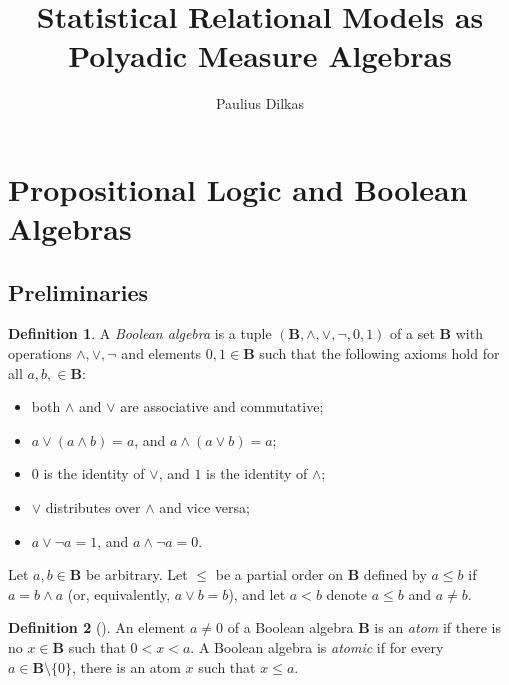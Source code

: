 \documentclass{article}
\title{Statistical Relational Models as Polyadic Measure Algebras}
\author{Paulius Dilkas}
\theoremstyle{definition}
\newtheorem{definition}{Definition}
\theoremstyle{remark}
\begin{document}
\maketitle



\section{Propositional Logic and Boolean Algebras}

\subsection{Preliminaries}

\begin{definition}
  A \emph{Boolean algebra} is a tuple $(\mathbf{B}, \land, \lor, \neg, 0, 1)$ of
  a set $\mathbf{B}$ with operations $\land, \lor, \neg$ and elements $0, 1 \in
  \mathbf{B}$ such that the following axioms hold for all $a, b, \in
  \mathbf{B}$:
  \begin{itemize}
  \item both $\land$ and $\lor$ are associative and commutative;
  \item $a \lor (a \land b) = a$, and $a \land (a \lor b) = a$;
  \item $0$ is the identity of $\lor$, and $1$ is the identity of $\land$;
  \item $\lor$ distributes over $\land$ and vice versa;
  \item $a \lor \neg a = 1$, and $a \land \neg a = 0$.
  \end{itemize}

  Let $a, b \in \mathbf{B}$ be arbitrary. Let $\le$ be a partial order on
  $\mathbf{B}$ defined by $a \le b$ if $a = b \land a$ (or, equivalently, $a
  \lor b = b$), and let $a < b$ denote $a \le b$ and $a \ne b$.
\end{definition}

\begin{definition}[\cite{DBLP:books/daglib/0090259}]
  An element $a \ne 0$ of a Boolean algebra $\mathbf{B}$ is an \emph{atom} if
  there is no $x \in \mathbf{B}$ such that $0 < x < a$. A Boolean algebra is
  \emph{atomic} if for every $a \in \mathbf{B} \setminus \{ 0 \}$, there is an
  atom $x$ such that $x \le a$.
\end{definition}
\end{document}
